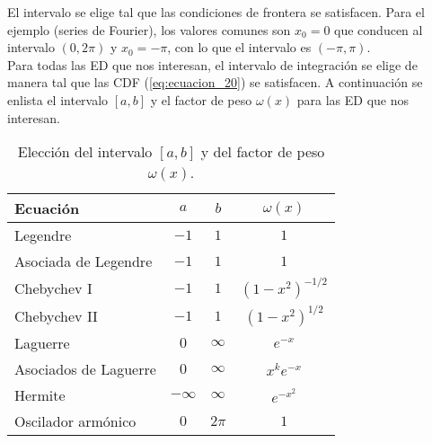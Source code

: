 El intervalo se elige tal que las condiciones de frontera se satisfacen. Para el ejemplo (series de Fourier), los valores comunes son $x_{0} = 0$ que conducen al intervalo $(0, 2 \pi)$ y $x_{0} = - \pi$, con lo que el intervalo es $(-\pi, \pi)$.
\\
Para todas las ED que nos interesan, el intervalo de integración se elige de manera tal que las CDF (\ref{eq:ecuacion_20}) se satisfacen. A continuación se enlista el intervalo $[a, b]$ y el factor de peso $\omega (x)$ para las ED que nos interesan.
\begin{table}[H]
\begin{center}
\begin{tabular}{p{5cm} c c c}
\hline
Ecuación & $a$ & $b$ & $\omega(x)$ \\ \hline
Legendre & $-1$ & $1$ & $1$ \\
Asociada de  Legendre & $-1$ & $1$ & $1$ \\
Chebychev I & $-1$ & $1$ & $(1-x^{2})^{-1/2}$ \\
Chebychev II & $-1$ & $1$ & $(1-x^{2})^{1/2}$ \\
Laguerre & $0$ & $\infty$ & $e^{-x}$ \\
Asociados de Laguerre & $0$ & $\infty$ & $x^{k} e^{-x}$ \\
Hermite & $-\infty$ & $\infty$ & $e^{-x^{2}}$ \\
Oscilador armónico & $0$ & $2 \pi$ & $1$ \\
\end{tabular}
\end{center}
\caption{Elección del intervalo $[a,b]$ y del factor de peso $\omega(x)$.}
\label{tabla:tabla_02}
\end{table}
